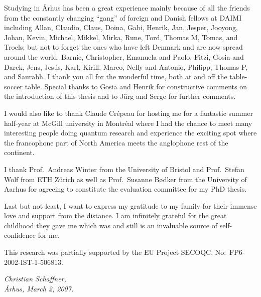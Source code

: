 Studying in {\AA}rhus has been a great experience mainly because of
all the friends from the constantly changing ``gang'' of foreign and
Danish fellows at DAIMI including Allan, Claudio, Claus, Doina, Gabi,
Henrik, Jan, Jesper, Jooyong, Johan, Kevin, Michael, Mikkel, Mirka,
Rune, Tord, Thomas M, Tomas, and Troels; but not to forget the ones
who have left Denmark and are now spread around the world:
Barnie, Christopher, Emanuela and Paolo, Fitzi, Gosia and Darek, Jens,
Jes\'us, Karl, Kirill, Marco, Nelly and Antonio, Philipp, Thomas P, and
Saurabh. I thank you all for the wonderful time, both at and off the
table-soccer table. Special thanks to
Gosia and Henrik for constructive comments on the introduction of this
thesis and to J\"urg and Serge for further comments.

I would also like to thank Claude Cr\'epeau for hosting me for a
fantastic summer half-year at McGill university in Montr\'eal where I
had the chance to meet many interesting people doing quantum research
and experience the exciting spot where the francophone part of North
America meets the anglophone rest of the continent.

I thank Prof.~Andreas Winter from the University of Bristol and
Prof.~Stefan Wolf from ETH Z\"urich as well as Prof.~Susanne
B{\o}dker from the University of Aarhus for agreeing to constitute the
evaluation committee for my PhD thesis.

Last but not least, I want to express my gratitude to my family for
their immense love and support from the distance. I am infinitely
grateful for the great childhood they gave me which was and still is an
invaluable source of self-confidence for me.

\vspace{8mm}
This research was partially supported by the EU Project SECOQC,
No:~FP6-2002-IST-1-506813.

\vspace{2ex}
\begin{flushright}
  \emph{Christian Schaffner,}\\
  \emph{{\AA}rhus, March 2, 2007.}
\end{flushright}

